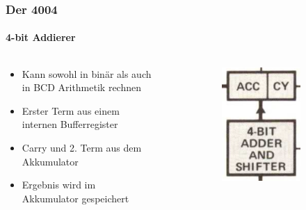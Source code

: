 \begin{frame}
	\frametitle{Der 4004}
	\framesubtitle{4-bit Addierer}
	\begin{columns}
		\begin{column}{.5\textwidth}
			\begin{itemize}
				\item Kann sowohl in binär als auch in BCD Arithmetik rechnen
				\item Erster Term aus einem internen Bufferregister
				\item Carry und 2. Term aus dem Akkumulator
				\item Ergebnis wird im Akkumulator gespeichert
			\end{itemize}
		\end{column}
		\begin{column}{.5\textwidth}
			\begin{figure}
				\begin{figure}[ht]
					\includegraphics[width=0.6\linewidth]{images/adder.png}
				\end{figure}
			\end{figure}
		\end{column}
	\end{columns}
\end{frame}

